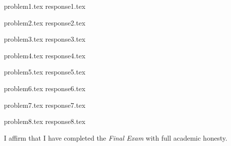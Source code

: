 \documentclass[letterpaper, 12pt]{article}
\begin{document}

{problem1.tex}
{response1.tex}

{problem2.tex}
{response2.tex}

{problem3.tex}
{response3.tex}

{problem4.tex}
{response4.tex}

{problem5.tex}
{response5.tex}

{problem6.tex}
{response6.tex}

{problem7.tex}
{response7.tex}

{problem8.tex}
{response8.tex}


\par

I affirm that I have completed the \textit{Final Exam} with full academic honesty.
\end{document}
